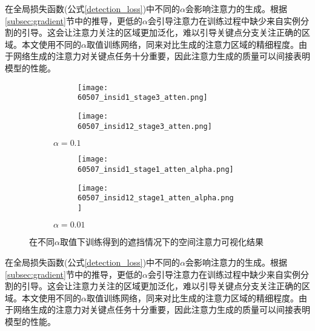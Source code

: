 在全局损失函数(公式\eqref{detection_loss})中不同的$\alpha$会影响注意力的生成。根据\ref{subsec:gradient}节中的推导，更低的$\alpha$会引导注意力在训练过程中缺少来自实例分割的引导。这会让注意力关注的区域更加泛化，难以引导关键点分支关注正确的区域。本文使用不同的$\alpha$取值训练网络，同来对比生成的注意力区域的精细程度。由于网络生成的注意力对关键点任务十分重要，因此注意力生成的质量可以间接表明模型的性能。


\begin{figure}[H]
	\centering
	\begin{subfigure}{0.3\textwidth}
		\centering
		\begin{subfigure}{\linewidth}
			\texttt{[image: 60507\_insid1\_stage3\_atten.png]}
		\end{subfigure}
		\vskip2pt
		\begin{subfigure}{\linewidth}
			\texttt{[image: 60507\_insid12\_stage3\_atten.png]}
		\end{subfigure}
		\caption{$\alpha=0.1$}
	\end{subfigure}
	\begin{subfigure}{0.3\textwidth}
		\centering
		\begin{subfigure}{\linewidth}
			\texttt{[image: 60507\_insid1\_stage1\_atten\_alpha.png]}
		\end{subfigure}
		\vskip2pt
		\begin{subfigure}{\linewidth}
			\texttt{[image: 60507\_insid12\_stage1\_atten\_alpha.png]}
		\end{subfigure}
		\caption{$\alpha=0.01$}
	\end{subfigure}
	\begin{minipage}{0.05\linewidth}
		
		\vskip2cm
	\end{minipage}
	\caption{在不同$\alpha$取值下训练得到的遮挡情况下的空间注意力可视化结果}
	\label{fig:attenalpha}
\end{figure}

在全局损失函数(公式\eqref{detection_loss})中不同的$\alpha$会影响注意力的生成。根据\ref{subsec:gradient}节中的推导，更低的$\alpha$会引导注意力在训练过程中缺少来自实例分割的引导。这会让注意力关注的区域更加泛化，难以引导关键点分支关注正确的区域。本文使用不同的$\alpha$取值训练网络，同来对比生成的注意力区域的精细程度。由于网络生成的注意力对关键点任务十分重要，因此注意力生成的质量可以间接表明模型的性能。

